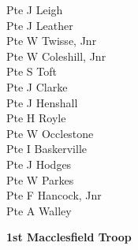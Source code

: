 \begin{multicols}{3}
  Pte J Leigh \\
  Pte J Leather \\
  Pte W Twisse, Jnr \\
  Pte W Coleshill, Jnr \\
  Pte S Toft \\
  Pte J Clarke \\
  Pte J Henshall \\
  Pte H Royle \\
  Pte W Occlestone \\
  Pte I Baskerville \\
  Pte J Hodges \\
  Pte W Parkes \\
  Pte F Hancock, Jnr \\
  Pte A Walley \\
\end{multicols}

\vspace*{10mm}

\begin{center}
  \Large
  \textbf{1st Macclesfield Troop}
\end{center}

